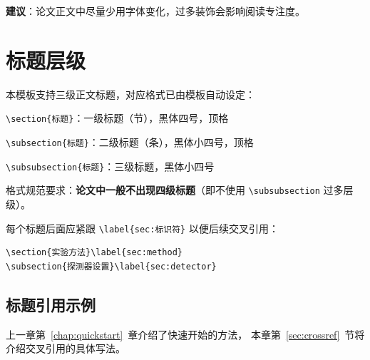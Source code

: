 \textbf{建议}：论文正文中尽量少用字体变化，过多装饰会影响阅读专注度。

\section{标题层级}

本模板支持三级正文标题，对应格式已由模板自动设定：

\begin{compactitem}
    \item \verb|\section{标题}|：一级标题（节），黑体四号，顶格
    \item \verb|\subsection{标题}|：二级标题（条），黑体小四号，顶格
    \item \verb|\subsubsection{标题}|：三级标题，黑体小四号
\end{compactitem}

格式规范要求：\textbf{论文中一般不出现四级标题}（即不使用 \verb|\subsubsection| 过多层级）。

每个标题后面应紧跟 \verb|\label{sec:标识符}| 以便后续交叉引用：

\begin{verbatim}
\section{实验方法}\label{sec:method}
\subsection{探测器设置}\label{sec:detector}
\end{verbatim}

\subsection{标题引用示例}

上一章第~\ref{chap:quickstart}~章介绍了快速开始的方法，
本章第~\ref{sec:crossref}~节将介绍交叉引用的具体写法。

